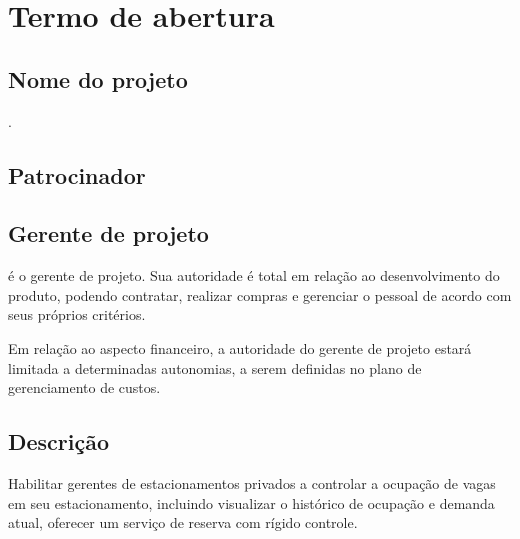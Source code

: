 
\chapter{Termo de abertura}

\section{Nome do projeto}

\projectName{}.

\section{Patrocinador}

\projectSponsorName{}


\section{Gerente de projeto}

\projectManagerName{}{} é o gerente de projeto. Sua autoridade é total em relação ao desenvolvimento do produto, podendo contratar, realizar compras e gerenciar o pessoal de acordo com seus próprios critérios.

Em relação ao aspecto financeiro, a autoridade do gerente de projeto estará limitada a determinadas autonomias, a serem definidas no plano de gerenciamento de custos.


\section{Descrição}

Habilitar gerentes de estacionamentos privados a controlar a ocupação de vagas em seu estacionamento, incluindo visualizar o histórico de ocupação e demanda atual, oferecer um serviço de reserva com rígido controle.

